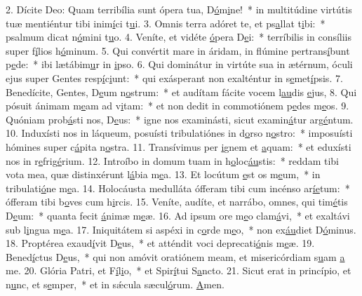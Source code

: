 2. Dícite Deo: Quam terribília sunt ópera tua, D\uline{ó}m\uline{i}ne!~* in multitúdine virtútis tuæ mentiéntur tibi inim\uline{í}ci t\uline{u}i.
3. Omnis terra adóret te, et ps\uline{a}llat t\uline{i}bi:~* psalmum dicat n\uline{ó}mini t\uline{u}o.
4. Veníte, et vidéte \uline{ó}pera D\uline{e}i:~* terríbilis in consíliis super f\uline{í}lios h\uline{ó}minum.
5. Qui convértit mare in áridam, in flúmine pertrans\uline{í}bunt p\uline{e}de:~* ibi lætábim\uline{u}r in \uline{i}pso.
6. Qui dominátur in virtúte sua in ætérnum, óculi ejus super Gentes resp\uline{í}c\uline{i}unt:~* qui exásperant non exalténtur in s\uline{e}met\uline{í}psis.
7. Benedícite, Gentes, D\uline{e}um n\uline{o}strum:~* et audítam fácite vocem l\uline{au}dis \uline{e}jus,
8. Qui pósuit ánimam m\uline{e}am ad v\uline{i}tam:~* et non dedit in commotiónem p\uline{e}des m\uline{e}os.
9. Quóniam prob\uline{á}sti nos, D\uline{e}us:~* igne nos examinásti, sicut examin\uline{á}tur arg\uline{é}ntum.
10. Induxísti nos in láqueum, posuísti tribulatiónes in d\uline{o}rso n\uline{o}stro:~* imposuísti hómines super c\uline{á}pita n\uline{o}stra.
11. Transívimus per \uline{i}gnem et \uline{a}quam:~* et eduxísti nos in r\uline{e}frig\uline{é}rium.
12. Introíbo in domum tuam in h\uline{o}loc\uline{áu}stis:~* reddam tibi vota mea, quæ distinxérunt l\uline{á}bia m\uline{e}a.
13. Et locútum \uline{e}st os m\uline{e}um,~* in tribulati\uline{ó}ne m\uline{e}a.
14. Holocáusta medulláta ófferam tibi cum incénso ar\uline{í}\uline{e}tum:~* ófferam tibi b\uline{o}ves cum h\uline{i}rcis.
15. Veníte, audíte, et narrábo, omnes, qui tim\uline{é}tis D\uline{e}um:~* quanta fecit \uline{á}nimæ m\uline{e}æ.
16. Ad ipsum ore m\uline{e}o clam\uline{á}vi,~* et exaltávi sub l\uline{i}ngua m\uline{e}a.
17. Iniquitátem si aspéxi in c\uline{o}rde m\uline{e}o,~* non ex\uline{áu}diet D\uline{ó}minus.
18. Proptérea exaud\uline{í}vit D\uline{e}us,~* et atténdit voci deprecati\uline{ó}nis m\uline{e}æ.
19. Bened\uline{í}ctus D\uline{e}us,~* qui non amóvit oratiónem meam, et misericórdiam s\uline{u}am \uline{a} me.
20. Glória Patri, et F\uline{í}l\uline{i}o,~* et Spir\uline{í}tui S\uline{a}ncto.
21. Sicut erat in princípio, et n\uline{u}nc, et s\uline{e}mper,~* et in sǽcula sæcul\uline{ó}rum. \uline{A}men.
